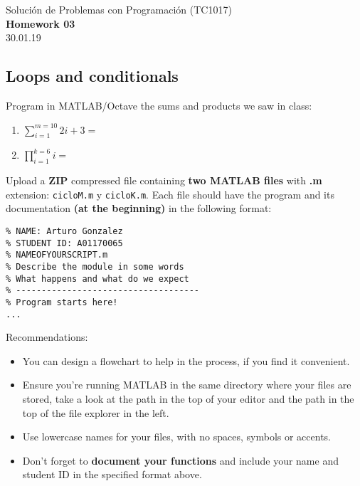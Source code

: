 \documentclass[]{book}
\theoremstyle{definition}
\begin{document}
\begin{center}
{\huge Solución de Problemas con Programación (TC1017)}\\[1.5ex]
{\large \textbf{Homework 03}\\[1.5ex] %
30.01.19} %
\end{center}

\vspace{0.2 cm}

\subsection*{Loops and conditionals}

Program in MATLAB/Octave the sums and products we saw in class:

\begin{enumerate}[label=\alph*)]
    \itemsep2.5ex
    \item {\Large $\sum \limits_{i=1}^{m=10} 2i + 3 =$}
    \item {\Large $\prod \limits_{i=1}^{k=6} i =$}
\end{enumerate}

\bigskip

Upload a \textbf{ZIP} compressed file containing \textbf{two MATLAB files} with \textbf{.m} extension:
\texttt{cicloM.m} y \texttt{cicloK.m}.
Each file should have the program and its documentation \textbf{(at the beginning)} in the following format:

\bigskip

\begin{lstlisting}[style=Matlab-editor]
% ------------------------------------
% NAME: Arturo Gonzalez
% STUDENT ID: A01170065
% NAMEOFYOURSCRIPT.m
% Describe the module in some words
% What happens and what do we expect
% ------------------------------------
% Program starts here!
...
\end{lstlisting}

\bigskip

{\Large Recommendations:}
\begin{itemize}
    \item You can design a flowchart to help in the process, if you find it convenient.
    \item Ensure you're running MATLAB in the same directory where your files are stored, take a look at the path in the top of your editor and the path in the top of the file explorer in the left.
    \item Use lowercase names for your files, with no spaces, symbols or accents.
    \item Don't forget to \textbf{document your functions} and include your name and student ID in the specified format above.
\end{itemize}
\end{document}
